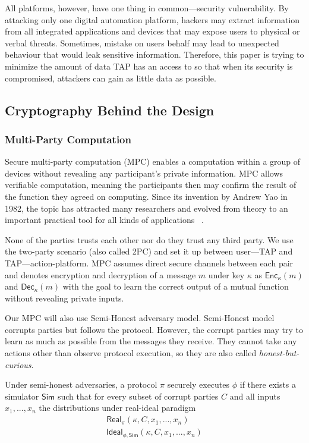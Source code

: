 All platforms, however, have one thing in common---security vulnerability. By attacking only one digital
automation platform, hackers may extract information from all integrated applications and devices that
may expose users to physical or verbal threats. Sometimes, mistake on users behalf may lead to
unexpected behaviour that would leak sensitive information. Therefore, this paper is trying to minimize
the amount of data TAP has an access to so that when its security is compromised, attackers can gain as
little data as possible.


\subsection{Cryptography Behind the Design}

\subsubsection{Multi-Party Computation}

Secure multi-party computation (MPC) enables a computation within a group of devices without revealing
any participant's private information. MPC allows verifiable computation, meaning the participants then
may confirm the result of the function they agreed on computing. Since its invention by Andrew Yao in
1982, the topic has attracted many researchers and evolved from theory to an important practical tool for
all kinds of applications ~\cite{DBLP:journals/ftsec/EvansKR18}. 

None of the parties trusts each other nor do they trust any third party. We use the two-party scenario (also called 2PC) and set it up between user---TAP and TAP---action-platform. MPC assumes direct secure channels between each pair and denotes encryption and decryption of a message $m$ under key $\kappa$ as $\mathsf{Enc}_\kappa(m)$ and $\mathsf{Dec}_\kappa(m)$ with the goal to learn the correct output of a mutual function without revealing private inputs. 

Our MPC will also use Semi-Honest adversary model. Semi-Honest model corrupts parties but follows
the protocol. However, the corrupt parties may try to learn as much as possible from the messages they receive. They cannot take any actions other than observe protocol execution, so they are also called \emph{honest-but-curious}. 

Under semi-honest adversaries, a protocol $\pi$ securely executes $\phi$ if there exists a simulator $\mathsf{Sim}$ such that for every subset of corrupt parties $C$ and all inputs $x_1, ..., x_n$ the distributions under real-ideal paradigm 
\begin{gather*}
  \mathsf{Real}_{\pi}(\kappa, C, x_1, ..., x_n) \\
  \mathsf{Ideal}_{\phi, \mathsf{Sim}} (\kappa, C, x_1, ..., x_n)
\end{gather*} 

